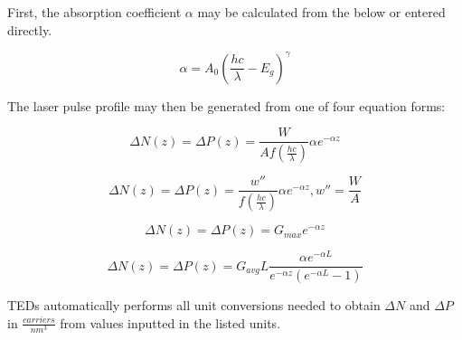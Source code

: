 \documentclass[11pt,letterpaper,titlepage]{article}
\begin{document}
			\par First, the absorption coefficient $\alpha$ may be calculated from the below or entered directly.
			
			\begin{equation}
				\label{eq:LGC_absorption}
				\alpha = A_{0}\left(\frac{hc}{\lambda} - E_{g}\right)^{\gamma}
			\end{equation}
		
			\par The laser pulse profile may then be generated from one of four equation forms:
			
			\begin{equation}
				\label{eq:LGC_power}
				\Delta N(z) = \Delta P(z) = \frac{W}{Af\left(\frac{hc}{\lambda}\right)} \alpha e^{-\alpha z}
			\end{equation}
		
			\begin{equation}
				\label{eq:LGC_powerdensity}
				\Delta N(z) = \Delta P(z) = \frac{w''}{f\left(\frac{hc}{\lambda}\right)} \alpha e^{-\alpha z}, w''=\frac{W}{A}
			\end{equation}
		
			\begin{equation}
				\label{eq:LGC_maxgen}
				\Delta N(z) = \Delta P(z) = G_{max} e^{-\alpha z}
			\end{equation}
		
			\begin{equation}
				\label{eq:LGC_avggen}
				\Delta N(z) = \Delta P(z) = G_{avg}L\frac{\alpha e^{-\alpha L}}{e^{-\alpha z}\left(e^{-\alpha L} - 1 \right)}
			\end{equation}
		
			\par TEDs automatically performs all unit conversions needed to obtain $\Delta N$ and $\Delta P$ in $\frac{carriers}{nm^{3}}$ from values inputted in the listed units.
			
\end{document}
